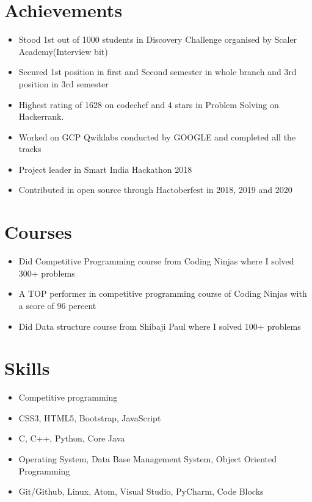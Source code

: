 \documentclass[letterpaper,11pt]{article}
\newcommand{\resumeItem}[1]{
  \item\small{
    {#1 \vspace{-2pt}}
  }
}
\newcommand{\resumeItemListStart}{\begin{itemize}}
\newcommand{\resumeItemListEnd}{\end{itemize}\vspace{-5pt}}
\begin{document}
%
\section{Achievements}
 \begin{itemize}[leftmargin=0.15in, label={}]
            \resumeItemListStart
            \resumeItem{Stood 1st out of 1000 students in Discovery Challenge organised by Scaler Academy(Interview bit)}
            
            \resumeItem{Secured 1st position in first and Second semester in whole branch and 3rd position in 3rd semester}
            
            \resumeItem{Highest rating of 1628 on codechef and 4 stars in Problem Solving on Hackerrank.}
            
            \resumeItem{Worked on GCP Qwiklabs conducted by GOOGLE and completed all the tracks}
            
            \resumeItem{Project leader in Smart India Hackathon 2018}
            
            \resumeItem{Contributed in open source through Hactoberfest in 2018, 2019 and 2020}
            
            
          \resumeItemListEnd
 \end{itemize}

\section{Courses}
 \begin{itemize}[leftmargin=0.15in, label={}]
            \resumeItemListStart
            \resumeItem{Did Competitive Programming course from Coding Ninjas where I solved 300+ problems}
            \resumeItem{A TOP performer in competitive programming course of Coding Ninjas with a  score of 96 percent}
            \resumeItem{Did Data structure course from Shibaji Paul where I solved 100+ problems}
            
          \resumeItemListEnd
 \end{itemize}
 
 \section{Skills}
 \begin{itemize}[leftmargin=0.15in, label={}]
            \resumeItemListStart
            \resumeItem{Competitive programming}
            \resumeItem{CSS3, HTML5, Bootstrap, JavaScript}
            \resumeItem{C, C++, Python, Core Java}
            \resumeItem{Operating System, Data Base Management System, Object Oriented Programming}
            \resumeItem{Git/Github, Linux, Atom, Visual Studio, PyCharm, Code Blocks}
            
          \resumeItemListEnd
 \end{itemize}
 
\end{document}
